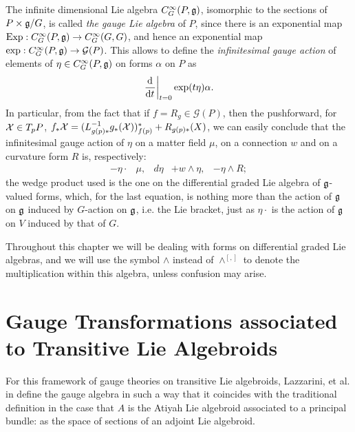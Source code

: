The infinite dimensional Lie algebra $C^\infty_G(P, \mathfrak{g})$, isomorphic to the sections of $P \times \mathfrak{g}/G$, is called \emph{the gauge Lie algebra} of $P$, since there is an exponential map $\text{Exp}: C^\infty_G(P, \mathfrak{g}) \to C^\infty_G(G, G)$, and hence an exponential map $\text{exp}: C^\infty_G(P, \mathfrak{g}) \to \mathcal G(P)$. This allows to define the \emph{infinitesimal gauge action} of elements of $\eta \in C^\infty_G(P, \mathfrak{g})$ on forms $\alpha$ on $P$ as
\begin{equation}
    \der{t}[t=0]{\text{exp}(t\eta)} \alpha.
\end{equation}
In particular, from the fact that if $f = R_g \in \mathcal G(P)$, then the pushforward, for $\mathcal{X} \in T_pP$, $f_* \mathcal{X} = (L_{g(p) *}^{-1} g_*(\mathcal{X}))^*_{f(p)} + R_{g(p)*}(X)$, we can easily conclude that the infinitesimal gauge action of $\eta$ on a matter field $\mu$, on a connection $w$ and on a curvature form $R$ is, respectively:
\begin{align}
    -\eta \cdot & \mu, &
    d\eta &+ w \wedge \eta, &
    - \eta \wedge  R;
\end{align}
the wedge product used is the one on the differential graded Lie algebra of $\mathfrak{g}$-valued forms, which, for the last equation, is nothing more than the action of $\mathfrak{g}$ on $\mathfrak{g}$ induced by $G$-action on $\mathfrak{g}$, i.e. the Lie bracket, just as $\eta \cdot$ is the action of $\mathfrak{g}$ on $V$ induced by that of $G$. 

Throughout this chapter we will be dealing with forms on differential graded Lie algebras, and we will use the symbol $\wedge$ instead of $\wedge^{[,]}$ to denote the multiplication within this algebra, unless confusion may arise.

\section{Gauge Transformations associated to Transitive Lie Algebroids}

For this framework of gauge theories on transitive Lie algebroids, Lazzarini, et al. in \cite{Lazzarini2012} define the gauge algebra in such a way that it coincides with the traditional definition in the case that $A$ is the Atiyah Lie algebroid associated to a principal bundle: as the space of sections of an adjoint Lie algebroid.


